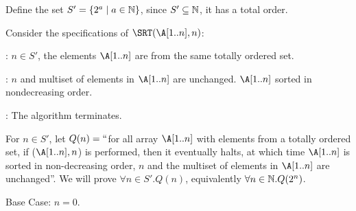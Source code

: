 \documentclass[11pt, sakura, night, 1in]{hw}
\begin{document}
\begin{comment}
    Since we assumed $\A[2^{n}+2^{n-1}]\in \aC''$, by modus ponens we have $\A[2^{n}+2^{n-1}]\in\aD'$ or $\A[2^{n}+2^{n-1}]\in\aC'$.

    \begin{proofcases}
        \case $\A[2^{n}+2^{n-1}]\in\aD'$.
        \indenv{
            
        }
        For Case 1 we have shown that $\A[2^{n}+2^{n-1}]\le \A[2^{n}+2^{n-1}+1]$.
        \case $\A[2^{n}+2^{n-1}]\in\aC'$.
        \indenv{
            
        }
        For Case 2 we have shown that $\A[2^{n}+2^{n-1}]\le \A[2^{n}+2^{n-1}+1]$.
    \end{proofcases}
\end{comment}

\begin{comment}
    \newq{4}{
    Prove that \SRT\, is correct. Your may assume that \AUX\, satisfies the specifications in your answer to question 2.
}
\end{comment}

Define the set $S'=\{2^a\mid a\in\mathbb{N}\}$, since $S'\subseteq\mathbb{N}$, it has a total order.


Consider the specifications of $\SRT(\A[1..n], n)$:

\Precon: $n\in S'$, the elements $\A[1..n]$ are from the same totally ordered set.

\Postcon: $n$ and multiset of elements in $\A[1..n]$ are unchanged. $\A[1..n]$ sorted in nondecreasing order.

\Termi: The algorithm terminates.

For $n\in S'$, let $Q(n)=``$for all array $\A[1..n]$ with elements from a totally ordered set, if \SRT($\A[1..n],n$) is performed, then it eventually halts, at which time $\A[1..n]$ is sorted in non-decreasing order, $n$ and the multiset of elements in $\A[1..n]$ are unchanged''. We will prove $\forall n\in S'.Q(n)$, equivalently $\forall n\in\mathbb{N}.Q(2^n)$.

Base Case: $n=0$.
\end{document}
